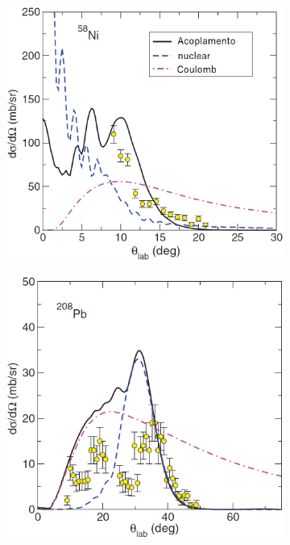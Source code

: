 \documentclass[a4paper,12pt,oneside]{book}
\begin{document}
\begin{figure}[H]
\centering
    \begin{subfigure}[t]{0.45\textwidth}
        \centering
        \includegraphics[scale=0.5, width=.97\columnwidth]{figs/dist_ang_2_cdcc_a.png}
        \caption{}
        \label{subfig:dist_ang_2_cdcc_a}
    \end{subfigure}%
    \hspace{0.5cm}
    \begin{subfigure}[t]{0.45\textwidth}
        \centering
        \includegraphics[scale=0.5, width=.97\columnwidth]{figs/dist_ang_2_cdcc_b.png}

\end{subfigure}
\end{figure}
\end{document}
